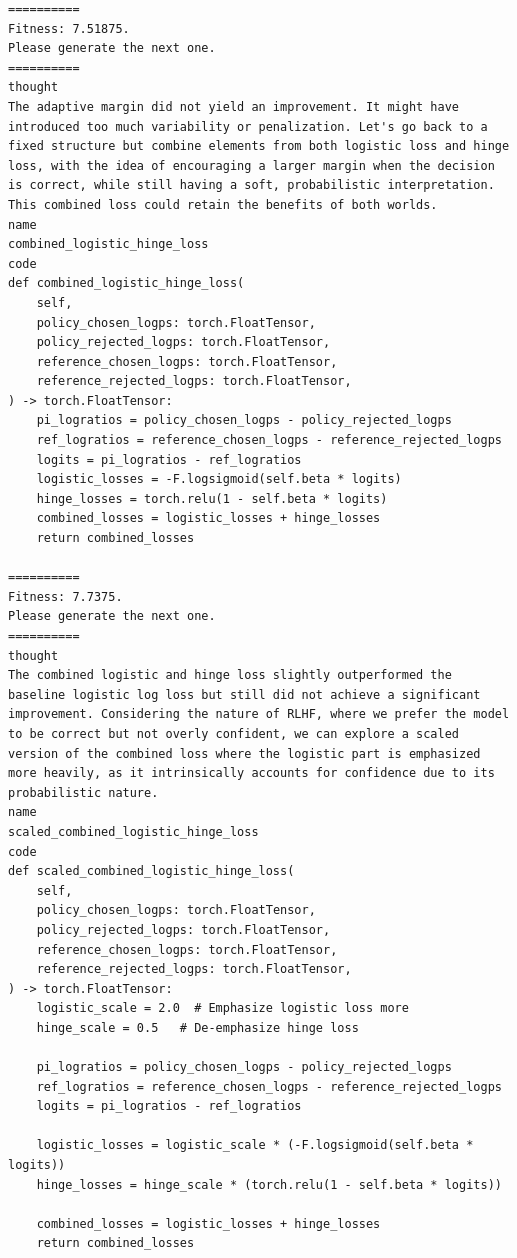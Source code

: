 \documentclass{article}
\theoremstyle{plain}
\theoremstyle{definition}
\theoremstyle{remark}
\begin{document}
\begin{lstlisting}
==========
Fitness: 7.51875.
Please generate the next one.
==========
thought
The adaptive margin did not yield an improvement. It might have introduced too much variability or penalization. Let's go back to a fixed structure but combine elements from both logistic loss and hinge loss, with the idea of encouraging a larger margin when the decision is correct, while still having a soft, probabilistic interpretation. This combined loss could retain the benefits of both worlds.
name
combined_logistic_hinge_loss
code
def combined_logistic_hinge_loss(
    self,
    policy_chosen_logps: torch.FloatTensor,
    policy_rejected_logps: torch.FloatTensor,
    reference_chosen_logps: torch.FloatTensor,
    reference_rejected_logps: torch.FloatTensor,
) -> torch.FloatTensor:
    pi_logratios = policy_chosen_logps - policy_rejected_logps
    ref_logratios = reference_chosen_logps - reference_rejected_logps
    logits = pi_logratios - ref_logratios
    logistic_losses = -F.logsigmoid(self.beta * logits)
    hinge_losses = torch.relu(1 - self.beta * logits)
    combined_losses = logistic_losses + hinge_losses
    return combined_losses
    
==========
Fitness: 7.7375.
Please generate the next one.
==========
thought
The combined logistic and hinge loss slightly outperformed the baseline logistic log loss but still did not achieve a significant improvement. Considering the nature of RLHF, where we prefer the model to be correct but not overly confident, we can explore a scaled version of the combined loss where the logistic part is emphasized more heavily, as it intrinsically accounts for confidence due to its probabilistic nature.
name
scaled_combined_logistic_hinge_loss
code
def scaled_combined_logistic_hinge_loss(
    self,
    policy_chosen_logps: torch.FloatTensor,
    policy_rejected_logps: torch.FloatTensor,
    reference_chosen_logps: torch.FloatTensor,
    reference_rejected_logps: torch.FloatTensor,
) -> torch.FloatTensor:
    logistic_scale = 2.0  # Emphasize logistic loss more
    hinge_scale = 0.5   # De-emphasize hinge loss

    pi_logratios = policy_chosen_logps - policy_rejected_logps
    ref_logratios = reference_chosen_logps - reference_rejected_logps
    logits = pi_logratios - ref_logratios

    logistic_losses = logistic_scale * (-F.logsigmoid(self.beta * logits))
    hinge_losses = hinge_scale * (torch.relu(1 - self.beta * logits))

    combined_losses = logistic_losses + hinge_losses
    return combined_losses
    

\end{lstlisting}
\end{document}

